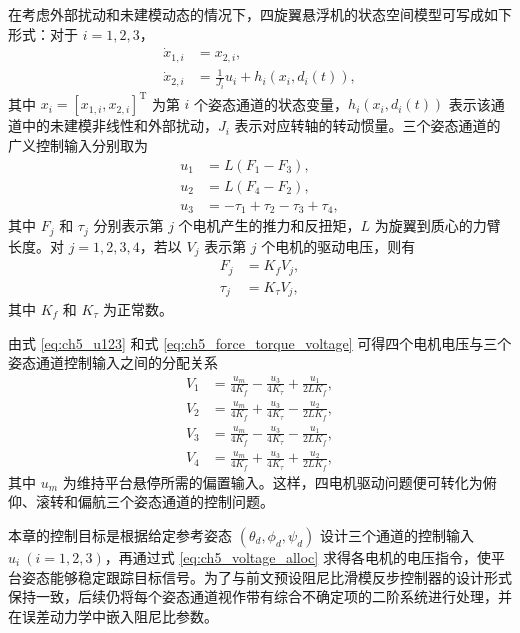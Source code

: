 在考虑外部扰动和未建模动态的情况下，四旋翼悬浮机的状态空间模型可写成如下形式：对于 $i=1,2,3$，
\begin{subequations}\label{eq:ch5_hover_model}
\begin{align}
\dot x_{1,i} &= x_{2,i},\\
\dot x_{2,i} &= \frac{1}{J_i}u_i + h_i(x_i,d_i(t)),
\end{align}
\end{subequations}
其中 $x_i=[x_{1,i},x_{2,i}]^{\mathrm T}$ 为第 $i$ 个姿态通道的状态变量，$h_i(x_i,d_i(t))$ 表示该通道中的未建模非线性和外部扰动，$J_i$ 表示对应转轴的转动惯量。三个姿态通道的广义控制输入分别取为
\begin{subequations}\label{eq:ch5_u123}
\begin{align}
u_1&=L(F_1-F_3),\\
u_2&=L(F_4-F_2),\\
u_3&=-\tau_1+\tau_2-\tau_3+\tau_4,
\end{align}
\end{subequations}
其中 $F_j$ 和 $\tau_j$ 分别表示第 $j$ 个电机产生的推力和反扭矩，$L$ 为旋翼到质心的力臂长度。对 $j=1,2,3,4$，若以 $V_j$ 表示第 $j$ 个电机的驱动电压，则有
\begin{subequations}\label{eq:ch5_force_torque_voltage}
\begin{align}
F_j&=K_fV_j,\\
\tau_j&=K_{\tau}V_j,
\end{align}
\end{subequations}
其中 $K_f$ 和 $K_{\tau}$ 为正常数。

由式 \eqref{eq:ch5_u123} 和式 \eqref{eq:ch5_force_torque_voltage} 可得四个电机电压与三个姿态通道控制输入之间的分配关系
\begin{subequations}\label{eq:ch5_voltage_alloc}
\begin{align}
V_1 &= \frac{u_m}{4K_f}-\frac{u_3}{4K_{\tau}}+\frac{u_1}{2LK_f},\\
V_2 &= \frac{u_m}{4K_f}+\frac{u_3}{4K_{\tau}}-\frac{u_2}{2LK_f},\\
V_3 &= \frac{u_m}{4K_f}-\frac{u_3}{4K_{\tau}}-\frac{u_1}{2LK_f},\\
V_4 &= \frac{u_m}{4K_f}+\frac{u_3}{4K_{\tau}}+\frac{u_2}{2LK_f},
\end{align}
\end{subequations}
其中 $u_m$ 为维持平台悬停所需的偏置输入。这样，四电机驱动问题便可转化为俯仰、滚转和偏航三个姿态通道的控制问题。


本章的控制目标是根据给定参考姿态 $(\theta_d,\phi_d,\psi_d)$ 设计三个通道的控制输入 $u_i\ (i=1,2,3)$，再通过式 \eqref{eq:ch5_voltage_alloc} 求得各电机的电压指令，使平台姿态能够稳定跟踪目标信号。为了与前文预设阻尼比滑模反步控制器的设计形式保持一致，后续仍将每个姿态通道视作带有综合不确定项的二阶系统进行处理，并在误差动力学中嵌入阻尼比参数。

